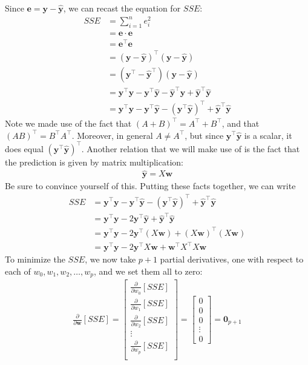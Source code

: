 \documentclass[12pt, a4paper]{article}
\theoremstyle{definition}
\begin{document}
	Since $\mathbf{e}=\mathbf{y}-\mathbf{\hat{y}}$, we can recast the equation for $SSE$:
	\begin{align*}
		SSE &= \sum_{i=1}^{n}e_i^2\\
		&=\mathbf{e}\cdot\mathbf{e}\\
		&=\mathbf{e}^\top \mathbf{e}\\
		&=(\mathbf{y}-\mathbf{\hat{y}})^\top(\mathbf{y} - \mathbf{\hat{y}})\\
		&=(\mathbf{y}^\top-\mathbf{\hat{y}}^\top)(\mathbf{y} - \mathbf{\hat{y}})\\
		&=\mathbf{y}^\top\mathbf{y}-\mathbf{y}^\top\mathbf{\hat{y}}-\mathbf{\hat{y}}^\top\mathbf{y}
		+\mathbf{\hat{y}}^\top\mathbf{\hat{y}}\\
		&=\mathbf{y}^\top\mathbf{y}-\mathbf{y}^\top\mathbf{\hat{y}}
		-(\mathbf{y}^\top\mathbf{\hat{y}})^\top
		+\mathbf{\hat{y}}^\top\mathbf{\hat{y}}
	\end{align*}
	Note we made use of the fact that $(A+B)^\top = A^\top + B^\top$, and that
	$(AB)^\top = B^\top A^\top$. Moreover, in general $A\neq A^\top$, but
	since $\mathbf{y}^\top \mathbf{\hat{y}}$ is a scalar, it does equal
	$(\mathbf{y}^\top\mathbf{\hat{y}})^\top$. Another relation that we will
	make use of is the fact that the prediction is given by matrix multiplication:
	\begin{align*}
		\hat{\mathbf{y}} = X\mathbf{w}
	\end{align*}
	Be sure to convince yourself of this. Putting these facts together, we can write
	\begin{align*}
		SSE &= 
		\mathbf{y}^\top\mathbf{y}-\mathbf{y}^\top\mathbf{\hat{y}}
		-(\mathbf{y}^\top\mathbf{\hat{y}})^\top
		+\mathbf{\hat{y}}^\top\mathbf{\hat{y}}\\
		&= \mathbf{y}^\top\mathbf{y}-2\mathbf{y}^\top\mathbf{\hat{y}}
		+\mathbf{\hat{y}}^\top\mathbf{\hat{y}}\\
		&=\mathbf{y}^\top\mathbf{y} - 2\mathbf{y}^\top (X\mathbf{w})+(X\mathbf{w})^\top(X\mathbf{w})\\
		&=\mathbf{y}^\top\mathbf{y}-2\mathbf{y}^\top X\mathbf{w}+\mathbf{w}^\top X^\top X\mathbf{w}
	\end{align*}
	To minimize the $SSE$, we now take $p+1$ partial derivatives, one with respect
	to each of $w_0,w_1,w_2,\ldots,w_p$, and we set them all to zero:
	\begin{align*}
		\frac{\partial}{\partial \mathbf{w}}[SSE] = \begin{bmatrix}
			\frac{\partial}{\partial w_0}[SSE]\\
			\frac{\partial}{\partial w_1}[SSE]\\
			\frac{\partial}{\partial w_2}[SSE]\\
			\vdots\\
			\frac{\partial}{\partial w_p}[SSE]\\
		\end{bmatrix}
		=\begin{bmatrix}
			0\\
			0\\
			0\\
			\vdots\\
			0
		\end{bmatrix}
		=\mathbf{0}_{p+1}
	\end{align*}
\end{document}
